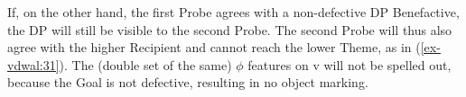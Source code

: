 \documentclass[output=paper
,modfonts
,nonflat]{langsci/langscibook}
\begin{document}
\begin{figure}[!h]
\begin{exe}
\end{exe} \vspace{-2cm}
\end{figure} \noindent
If, on the other hand, the first Probe agrees with a non-defective DP Benefactive, the DP will still be visible to the second Probe. The second Probe will thus also agree with the higher Recipient and cannot reach the lower Theme, as in (\ref{ex-vdwal:31}). The (double set of the same) $\phi$ features on v will not be spelled out, because the Goal is not defective, resulting in no object marking.
\end{document}
